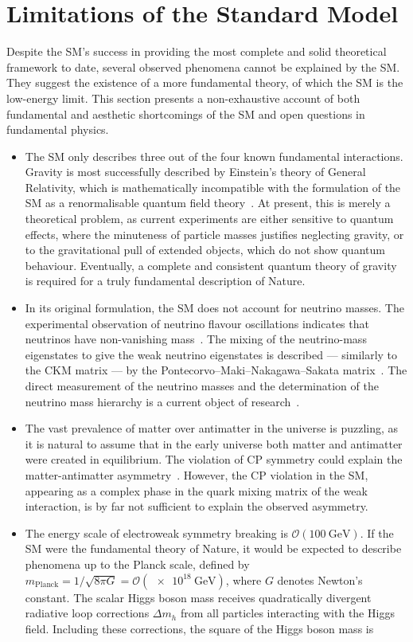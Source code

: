\section{Limitations of the Standard Model}
\label{sec:sm:limitations}
Despite the SM's success in providing the most complete and solid theoretical framework to date, several observed phenomena cannot be explained by the SM. They suggest the existence of a more fundamental theory, of which the SM is the low-energy limit. This section presents a non-exhaustive account of both fundamental and aesthetic shortcomings of the SM and open questions in fundamental physics.
\begin{itemize}
    \item The SM only describes three out of the four known fundamental interactions. Gravity is most successfully described by Einstein's theory of General Relativity, which is mathematically incompatible with the formulation of the SM as a renormalisable quantum field theory~\cite{DeWitt1967,DeWitt1967-2,DeWitt1967-3,Feynman2018}. At present, this is merely a theoretical problem, as current experiments are either sensitive to quantum effects, where the minuteness of particle masses justifies neglecting gravity, or to the gravitational pull of extended objects, which do not show quantum behaviour. Eventually, a complete and consistent quantum theory of gravity is required for a truly fundamental description of Nature.
    \item In its original formulation, the SM does not account for neutrino masses. The experimental observation of neutrino flavour oscillations indicates that neutrinos have non-vanishing mass~\cite{GonzalezGarcia2008}. The mixing of the neutrino-mass eigenstates to give the weak neutrino eigenstates is described --- similarly to the CKM matrix --- by the Pontecorvo–Maki–Nakagawa–Sakata matrix~\cite{Pontecorvo1967,Maki1962}. The direct measurement of the neutrino masses and the determination of the neutrino mass hierarchy is a current object of research~\cite{Aker2020}.
    \item The vast prevalence of matter over antimatter in the universe is puzzling, as it is natural to assume that in the early universe both matter and antimatter were created in equilibrium. The violation of CP symmetry could explain the matter-antimatter asymmetry~\cite{Sakharov1991}. However, the CP violation in the SM, appearing as a complex phase in the quark mixing matrix of the weak interaction, is by far not sufficient to explain the observed asymmetry.
    \item The energy scale of electroweak symmetry breaking is \(\mathcal{O}(\SI{100}{\giga\electronvolt})\). If the SM were the fundamental theory of Nature, it would be expected to describe phenomena up to the Planck scale, defined by \(m_{\text{Planck}} = 1 / \sqrt{8 \pi G} = \mathcal{O}(\SI{e18}{\giga\electronvolt})\), where \(G\) denotes Newton's constant. The scalar Higgs boson mass receives quadratically divergent radiative loop corrections \(\Delta m_{h}\) from all particles interacting with the Higgs field. Including these corrections, the square of the Higgs boson mass is

\end{itemize}
